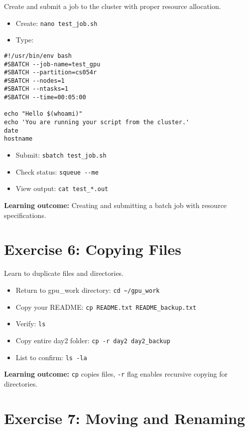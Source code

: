\documentclass[11pt, a4paper]{article}
\newcommand{\code}[1]{\texttt{#1}}
\begin{document}
Create and submit a job to the cluster with proper resource allocation.

\begin{itemize}
    \item Create: \code{nano test\_job.sh}
    \item Type:
\end{itemize}

\begin{lstlisting}
#!/usr/bin/env bash
#SBATCH --job-name=test_gpu
#SBATCH --partition=cs054r
#SBATCH --nodes=1
#SBATCH --ntasks=1
#SBATCH --time=00:05:00

echo "Hello $(whoami)"
echo 'You are running your script from the cluster.'
date
hostname
\end{lstlisting}

\begin{itemize}
    \item Submit: \code{sbatch test\_job.sh}
    \item Check status: \code{squeue -{}-me}
    \item View output: \code{cat test\_*.out}
\end{itemize}

\textbf{Learning outcome:} Creating and submitting a batch job with resource specifications.

\section*{Exercise 6: Copying Files}

Learn to duplicate files and directories.

\begin{itemize}
    \item Return to gpu\_work directory: \code{cd \textasciitilde/gpu\_work}
    \item Copy your README: \code{cp README.txt README\_backup.txt}
    \item Verify: \code{ls}
    \item Copy entire day2 folder: \code{cp -r day2 day2\_backup}
    \item List to confirm: \code{ls -la}
\end{itemize}

\textbf{Learning outcome:} \code{cp} copies files, \code{-r} flag enables recursive copying for directories.

\section*{Exercise 7: Moving and Renaming}
\end{document}
